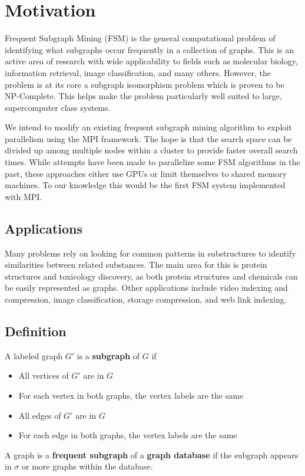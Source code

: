 \section{Motivation}
\label{sec:motivation}

Frequent Subgraph Mining (FSM) is the general computational problem of 
identifying what subgraphs occur frequently in a collection of graphs.  This 
is an active area of research with wide applicability to fields such as 
molecular biology, information retrieval, image classification, and many 
others.  However, the problem is at its core a subgraph isomorphism problem
which is proven to be NP-Complete\cite{cook1971complexity}.  This helps make
the problem particularly well suited to large, supercomputer class systems.

We intend to modify an existing frequent subgraph mining algorithm to exploit
parallelism using the MPI framework. The hope is that the search space can
be divided up among multiple nodes within a cluster to provide faster overall
search times.  While attempts have been made to parallelize some FSM 
algorithms in the past\cite{buehrer2005parallel,gspancuda}, these 
approaches either use GPUs or limit themselves to shared memory machines. 
To our knowledge this would be the first FSM system implemented with MPI.

\subsection{Applications}
\label{subsec:applications}

Many problems rely on looking for common patterns in substructures to identify
similarities between related substances.  The main area for this is protein
structures and toxicology discovery, as both protein
structures\cite{substructures} and chemicals\cite{toxic} can be easily
represented as graphs. Other applications include video indexing and
compression\cite{videosub}, image
classification\cite{de2012polynomial,plagram}, storage
compression\cite{stored}, and web link
indexing\cite{freqtrees,webgraphs}.

\subsection{Definition}
\label{subsec:complexity}

A labeled graph $G'$ is a {\bf subgraph} of $G$ if
\begin{itemize}
	\item{All vertices of $G'$ are in $G$}
	\item{For each vertex in both graphs, the vertex labels are the same}
	\item{All edges of $G'$ are in $G$ }
	\item{For each edge in both graphs, the vertex labels are the same}
\end{itemize}

A graph is a {\bf frequent subgraph} of a {\bf graph database} if the 
subgraph appears in $\sigma$ or more graphs within the database.



